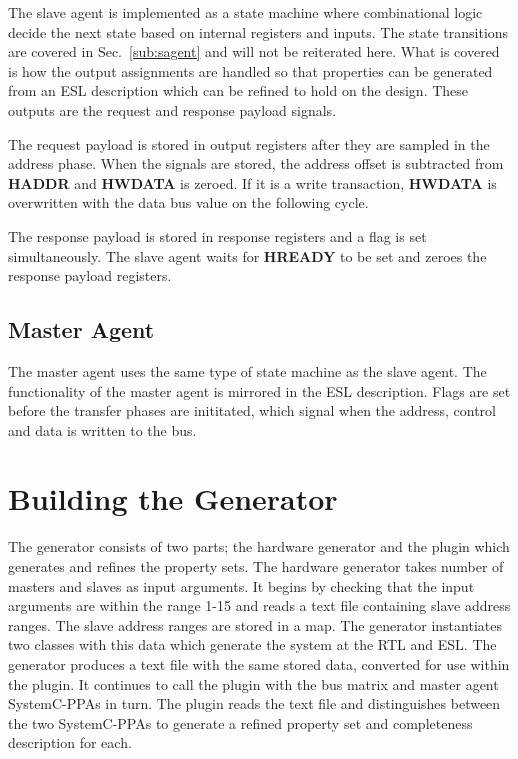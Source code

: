The slave agent is implemented as a state machine where combinational logic decide the next state based on internal registers and inputs. The state transitions are covered in Sec.~\ref{sub:sagent} and will not be reiterated here. What is covered is how the output assignments are handled so that properties can be generated from an ESL description which can be refined to hold on the design. These outputs are the request and response payload signals. \par
The request payload is stored in output registers after they are sampled in the address phase. When the signals are stored, the address offset is subtracted from \textbf{HADDR} and \textbf{HWDATA} is zeroed. If it is a write transaction, \textbf{HWDATA} is overwritten with the data bus value on the following cycle. \par
The response payload is stored in response registers and a flag is set simultaneously. The slave agent waits for \textbf{HREADY} to be set and zeroes the response payload registers.  



\subsection{Master Agent}
The master agent uses the same type of state machine as the slave agent. The functionality of the master agent is mirrored in the ESL description. Flags are set before the transfer phases are inititated, which signal when the address, control and data is written to the bus. 


\section{Building the Generator}
The generator consists of two parts; the hardware generator and the plugin which generates and refines the property sets. The hardware generator takes number of masters and slaves as input arguments. It begins by checking that the input arguments are within the range 1-15 and reads a text file containing slave address ranges. The slave address ranges are stored in a map. The generator instantiates two classes with this data which generate the system at the RTL and ESL. The generator produces a text file with the same stored data, converted for use within the plugin. It continues to call the plugin with the bus matrix and master agent SystemC-PPAs in turn. The plugin reads the text file and distinguishes between the two SystemC-PPAs to generate a refined property set and completeness description for each. 

